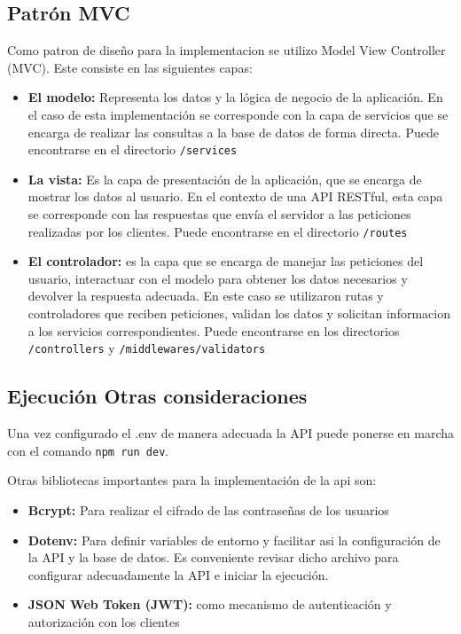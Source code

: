 \subsection{Patrón MVC}
Como patron de diseño para la implementacion se utilizo Model View Controller (MVC). Este consiste en las siguientes capas:
\begin{itemize}
  \item \textbf{El modelo: }Representa los datos y la lógica de negocio de la aplicación. En el caso de esta implementación se corresponde con la capa de servicios que se encarga de realizar las consultas a la base de datos de forma directa. Puede encontrarse en el directorio \texttt{/services}
  \item \textbf{La vista: }Es la capa de presentación de la aplicación, que se encarga de mostrar los datos al usuario. En el contexto de una API RESTful, esta capa se corresponde con las respuestas que envía el servidor a las peticiones realizadas por los clientes. Puede encontrarse en el directorio \texttt{/routes}
  \item \textbf{El controlador: }es la capa que se encarga de manejar las peticiones del usuario, interactuar con el modelo para obtener los datos necesarios y devolver la respuesta adecuada. En este caso se utilizaron rutas y controladores que reciben peticiones, validan los datos y solicitan informacion a los servicios correspondientes. Puede encontrarse en los directorios \texttt{/controllers} y \texttt{/middlewares/validators}
\end{itemize}

\subsection{Ejecución Otras consideraciones}
Una vez configurado el .env de manera adecuada la API puede ponerse en marcha con el comando \texttt{npm run dev}.

Otras bibliotecas importantes para la implementación de la api son:

\begin{itemize}
  \item \textbf{Bcrypt: }Para realizar el cifrado de las contraseñas de los usuarios
  \item \textbf{Dotenv: }Para definir variables de entorno y facilitar asi la configuración de la API y la base de datos. Es conveniente revisar dicho archivo para configurar adecuadamente la API e iniciar la ejecución.  
  \item \textbf{JSON Web Token (JWT): }como mecanismo de autenticación y autorización con los clientes
\end{itemize}

